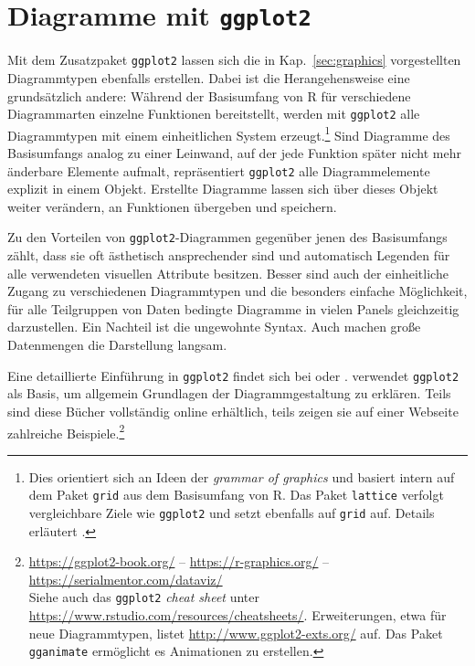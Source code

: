 \chapter{Diagramme mit \texttt{ggplot2}}
\label{sec:ggplot}

Mit dem Zusatzpaket \lstinline!ggplot2! lassen sich die in Kap.\ \ref{sec:graphics} vorgestellten Diagrammtypen ebenfalls erstellen. Dabei ist die Herangehensweise eine grundsätzlich andere: Während der Basisumfang von R für verschiedene Diagrammarten einzelne Funktionen bereitstellt, werden mit \lstinline!ggplot2! alle Diagrammtypen mit einem einheitlichen System erzeugt.\footnote{Dies orientiert sich an Ideen der \emph{grammar of graphics} \cite{Wilkinson2005} und basiert intern auf dem Paket  \lstinline!grid! aus dem Basisumfang von R. Das Paket \lstinline!lattice! verfolgt vergleichbare Ziele wie \lstinline!ggplot2! und setzt ebenfalls auf \lstinline!grid! auf. Details erläutert .} Sind Diagramme des Basisumfangs analog zu einer Leinwand, auf der jede Funktion später nicht mehr änderbare Elemente aufmalt, repräsentiert \lstinline!ggplot2! alle Diagrammelemente explizit in einem Objekt. Erstellte Diagramme lassen sich über dieses Objekt weiter verändern, an Funktionen übergeben und speichern.

Zu den Vorteilen von \lstinline!ggplot2!-Diagrammen gegenüber jenen des Basisumfangs zählt, dass sie oft ästhetisch ansprechender sind und automatisch Legenden für alle verwendeten visuellen Attribute besitzen. Besser sind auch der einheitliche Zugang zu verschiedenen Diagrammtypen und die besonders einfache Möglichkeit, für alle Teilgruppen von Daten bedingte Diagramme in vielen Panels gleichzeitig darzustellen. Ein Nachteil ist die ungewohnte Syntax. Auch machen große Datenmengen die Darstellung langsam.

Eine detaillierte Einführung in \lstinline!ggplot2! findet sich bei  oder .  verwendet \lstinline!ggplot2! als Basis, um allgemein Grundlagen der Diagrammgestaltung zu erklären. Teils sind diese Bücher vollständig online erhältlich, teils zeigen sie auf einer Webseite zahlreiche Beispiele.\footnote{\url{https://ggplot2-book.org/} --
\url{https://r-graphics.org/} -- \url{https://serialmentor.com/dataviz/}\\Siehe auch das \lstinline!ggplot2! \emph{cheat sheet} unter \url{https://www.rstudio.com/resources/cheatsheets/}. Erweiterungen, etwa für neue Diagrammtypen, listet \url{http://www.ggplot2-exts.org/} auf. Das Paket \lstinline!gganimate! \cite{Pedersen2018} ermöglicht es Animationen zu erstellen.}

